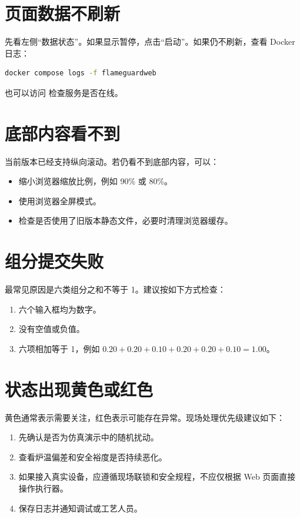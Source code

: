 \documentclass[UTF8,openany,zihao=-4,oneside]{ctexbook}
\newcommand{\pathcode}[1]{\texttt{\detokenize{#1}}}
\begin{document}
\section{页面数据不刷新}
先看左侧“数据状态”。如果显示暂停，点击“启动”。如果仍不刷新，查看 Docker 日志：

\begin{lstlisting}[language=bash]
docker compose logs -f flameguardweb
\end{lstlisting}

也可以访问 \pathcode{/healthz} 检查服务是否在线。

\section{底部内容看不到}
当前版本已经支持纵向滚动。若仍看不到底部内容，可以：
\begin{itemize}
  \item 缩小浏览器缩放比例，例如 90\% 或 80\%。
  \item 使用浏览器全屏模式。
  \item 检查是否使用了旧版本静态文件，必要时清理浏览器缓存。
\end{itemize}

\section{组分提交失败}
最常见原因是六类组分之和不等于 1。建议按如下方式检查：
\begin{enumerate}
  \item 六个输入框均为数字。
  \item 没有空值或负值。
  \item 六项相加等于 1，例如 \(0.20+0.20+0.10+0.20+0.20+0.10=1.00\)。
\end{enumerate}

\section{状态出现黄色或红色}
黄色通常表示需要关注，红色表示可能存在异常。现场处理优先级建议如下：
\begin{enumerate}
  \item 先确认是否为仿真演示中的随机扰动。
  \item 查看炉温偏差和安全裕度是否持续恶化。
  \item 如果接入真实设备，应遵循现场联锁和安全规程，不应仅根据 Web 页面直接操作执行器。
  \item 保存日志并通知调试或工艺人员。
\end{enumerate}
\end{document}
